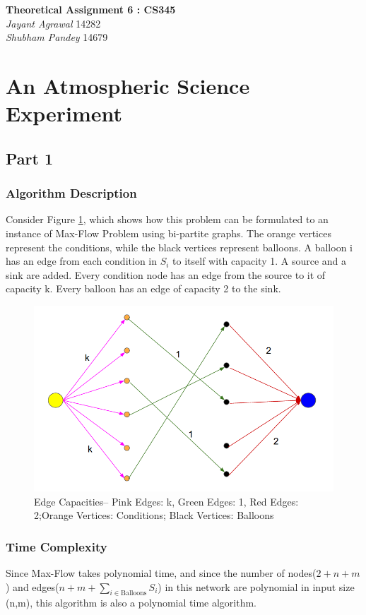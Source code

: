 \documentclass{article}
\begin{document}

\begin{center}
\textbf{\Large Theoretical Assignment 6 : CS345} \\
\textit{\large Jayant Agrawal}         14282 \\
\textit{\large Shubham Pandey}         14679
\end{center}

\section{An Atmospheric Science Experiment}

\subsection{Part 1}
\subsubsection{Algorithm Description}
Consider Figure \ref{sim}, which shows how this problem can be formulated to an instance of Max-Flow Problem using bi-partite graphs. The orange vertices represent the conditions, while the black vertices represent balloons. A balloon i has an edge from each condition in $S_i$ to itself with capacity 1. A source and a sink are added. Every condition node has an edge from the source to it of capacity k. Every balloon has an edge of capacity 2 to the sink.
\begin{figure}[h!]
\centering
\includegraphics[width=0.5\columnwidth]{fig_one.png}
\caption{ Edge Capacities-- Pink Edges: k, Green Edges: 1, Red Edges: 2;\newline Orange Vertices: Conditions; Black Vertices: Balloons}
\label{sim}
\end{figure}
\subsubsection{Time Complexity}
Since Max-Flow takes polynomial time, and since the number of nodes($2 + n + m$) and edges($n + m + \sum_{i \in \text{Balloons}}S_i$) in this network are polynomial in input size (n,m), this algorithm is also a polynomial time algorithm.
\end{document}
